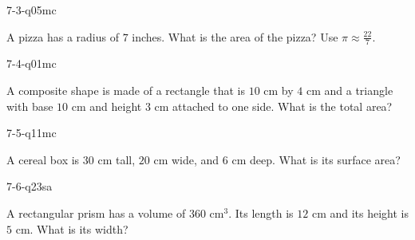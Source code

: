 \begin{practiceQuestion}{7-3-q05}{mc}
\begin{questionText}
A pizza has a radius of $7$ inches. What is the area of the pizza? Use $\pi \approx \frac{22}{7}$.
\end{questionText}
\end{practiceQuestion}

\begin{practiceQuestion}{7-4-q01}{mc}
\begin{questionText}
A composite shape is made of a rectangle that is $10$ cm by $4$ cm and a triangle with base $10$ cm and height $3$ cm attached to one side. What is the total area?
\end{questionText}
\end{practiceQuestion}

\begin{practiceQuestion}{7-5-q11}{mc}
\begin{questionText}
A cereal box is $30$ cm tall, $20$ cm wide, and $6$ cm deep. What is its surface area?
\end{questionText}
\end{practiceQuestion}

\begin{practiceQuestion}{7-6-q23}{sa}
\begin{questionText}
A rectangular prism has a volume of $360$ cm$^3$. Its length is $12$ cm and its height is $5$ cm. What is its width?
\end{questionText}
\end{practiceQuestion}

